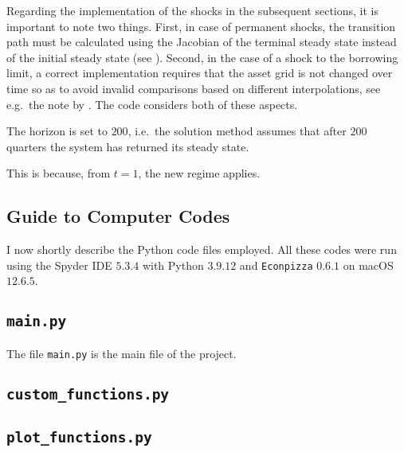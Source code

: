 \documentclass[a4paper,12pt]{article} %
\numberwithin{equation}{section} %
\numberwithin{figure}{section}
\numberwithin{table}{section}
\begin{document}
\begin{refsection}
\begin{appendices}
Regarding the implementation of the shocks in the subsequent sections, it is important to note two things. First, in case of permanent shocks, the transition path must be calculated using the Jacobian of the terminal steady state instead of the initial steady state (see \cite{auclert2021}). Second, in the case of a shock to the borrowing limit, a correct implementation requires that the asset grid is not changed over time so as to avoid invalid comparisons based on different interpolations, see e.g.~the note by \textcite{mellior2016mimeo}. The code considers both of these aspects.

The horizon is set to $200$, i.e.~the solution method assumes that after $200$ quarters the system has returned its steady state.


This is because, from $t=1$, the new regime applies.

\subsection{Guide to Computer Codes}
\label{sec-app:codes-guide}

I now shortly describe the Python code files employed. All these codes were run using the Spyder IDE $5.3.4$ with Python $3.9.12$ and \texttt{Econpizza} $0.6.1$ on macOS $12.6.5$.

\subsection*{\texttt{main.py}}

The file \texttt{main.py} is the main file of the project.

\subsection*{\texttt{custom\_functions.py}}

\subsection*{\texttt{plot\_functions.py}}


\end{appendices}
\end{refsection}
\end{document}
